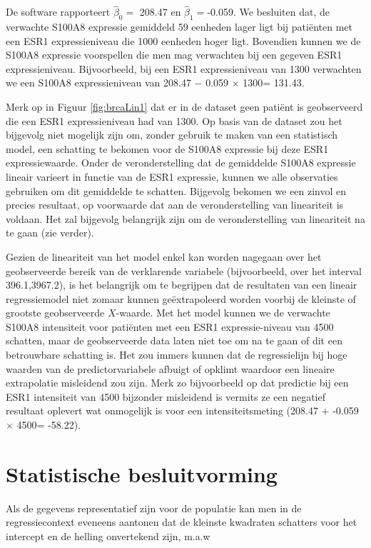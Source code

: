 \documentclass[
  12pt,dutch]{book}
\theoremstyle{definition}
\theoremstyle{definition}
\theoremstyle{definition}
\theoremstyle{definition}
\theoremstyle{remark}
\begin{document}
De software rapporteert \(\hat{\beta}_0=\) 208.47 en \(\hat{\beta}_1=\)-0.059. We besluiten dat, de verwachte S100A8 expressie gemiddeld 59 eenheden lager ligt bij patiënten met een ESR1 expressieniveau die 1000 eenheden hoger ligt.
Bovendien kunnen we de S100A8 expressie voorspellen die men mag verwachten bij een gegeven ESR1 expressieniveau. Bijvoorbeeld, bij een ESR1 expressieniveau van 1300 verwachten we een S100A8 expressieniveau van 208.47 \(-\) 0.059 \(\times\) 1300= 131.43.

Merk op in Figuur \ref{fig:brcaLin1} dat er in de dataset geen patiënt is geobserveerd die een ESR1 expressieniveau had van 1300. Op basis van de dataset zou het bijgevolg niet mogelijk zijn om, zonder gebruik te maken van een statistisch model, een schatting te bekomen voor de S100A8 expressie bij deze ESR1 expressiewaarde. Onder de veronderstelling dat de gemiddelde S100A8 expressie lineair varieert in functie van de ESR1 expressie, kunnen we alle observaties gebruiken om dit gemiddelde te schatten. Bijgevolg bekomen we een zinvol en precies resultaat, op voorwaarde dat aan de veronderstelling van lineariteit is voldaan. Het zal bijgevolg belangrijk zijn om de veronderstelling van lineariteit na te gaan (zie verder).

Gezien de lineariteit van het model enkel kan worden nagegaan over het
geobserveerde bereik van de verklarende variabele (bijvoorbeeld, over het
interval 396.1,3967.2), is het belangrijk om te begrijpen dat de resultaten van een lineair regressiemodel niet zomaar kunnen geëxtrapoleerd worden
voorbij de kleinste of grootste geobserveerde \(X\)-waarde.
Met het model kunnen we de verwachte S100A8 intensiteit voor patiënten met een
ESR1 expressie-niveau van 4500 schatten, maar de geobserveerde data laten niet toe om na te gaan of dit een
betrouwbare schatting is. Het zou immers kunnen dat de regressielijn bij hoge waarden van de predictorvariabele
afbuigt of opklimt waardoor een lineaire extrapolatie misleidend zou zijn.
Merk zo bijvoorbeeld op dat predictie bij een ESR1 intensiteit van 4500 bijzonder misleidend is vermits ze een negatief resultaat oplevert wat onmogelijk is voor een intensiteitsmeting (208.47 \(+\) -0.059 \(\times\) 4500= -58.22).

\section{Statistische besluitvorming}\label{sec:linBesluit}

Als de gegevens representatief zijn voor de populatie kan men in de regressiecontext eveneens aantonen dat de kleinste kwadraten schatters voor het intercept en de helling onvertekend zijn, m.a.w
\end{document}
